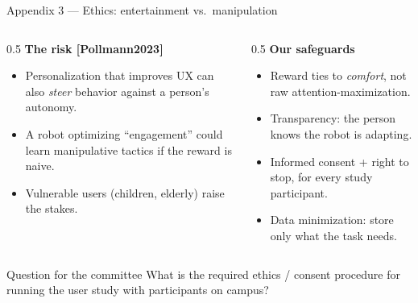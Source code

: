 \documentclass[aspectratio=169,10pt]{beamer}
\newcommand{\refnum}[1]{{\footnotesize\color{giuaccent}[#1]}}
\begin{document}
\begin{frame}{Appendix 3 --- Ethics: entertainment vs.\ manipulation}
  \begin{columns}[T]
    \begin{column}{0.5\textwidth}
      \textbf{The risk \refnum{Pollmann2023}}
      \begin{itemize}\footnotesize
        \item Personalization that improves UX can also \emph{steer} behavior against a person's autonomy.
        \item A robot optimizing ``engagement'' could learn manipulative tactics if the reward is naive.
        \item Vulnerable users (children, elderly) raise the stakes.
      \end{itemize}
    \end{column}
    \begin{column}{0.5\textwidth}
      \textbf{Our safeguards}
      \begin{itemize}\footnotesize
        \item Reward ties to \emph{comfort}, not raw attention-maximization.
        \item Transparency: the person knows the robot is adapting.
        \item Informed \alert{consent} + right to stop, for every study participant.
        \item Data minimization: store only what the task needs.
      \end{itemize}
    \end{column}
  \end{columns}
  \vspace{0.5em}
  \begin{alertblock}{Question for the committee}
    What is the required ethics / consent procedure for running the user study with participants on campus?
  \end{alertblock}
\end{frame}
\end{document}

